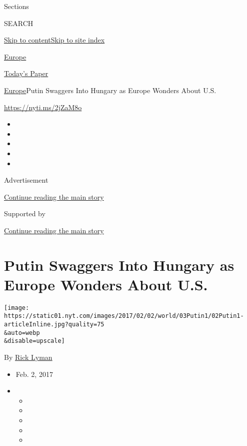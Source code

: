 Sections

SEARCH

\protect\hyperlink{site-content}{Skip to
content}\protect\hyperlink{site-index}{Skip to site index}

\href{https://www.nytimes.com/section/world/europe}{Europe}

\href{https://myaccount.nytimes.com/auth/login?response_type=cookie\&client_id=vi}{}

\href{https://www.nytimes.com/section/todayspaper}{Today's Paper}

\href{/section/world/europe}{Europe}\textbar{}Putin Swaggers Into
Hungary as Europe Wonders About U.S.

\url{https://nyti.ms/2jZaM8o}

\begin{itemize}
\item
\item
\item
\item
\item
\end{itemize}

Advertisement

\protect\hyperlink{after-top}{Continue reading the main story}

Supported by

\protect\hyperlink{after-sponsor}{Continue reading the main story}

\hypertarget{putin-swaggers-into-hungary-as-europe-wonders-about-us}{%
\section{Putin Swaggers Into Hungary as Europe Wonders About
U.S.}\label{putin-swaggers-into-hungary-as-europe-wonders-about-us}}

\texttt{[image: https://static01.nyt.com/images/2017/02/02/world/03Putin1/02Putin1-articleInline.jpg?quality=75\\\&auto=webp\\\&disable=upscale]}

By \href{https://www.nytimes.com/by/rick-lyman}{Rick Lyman}

\begin{itemize}
\item
  Feb. 2, 2017
\item
  \begin{itemize}
  \item
  \item
  \item
  \item
  \item
  \end{itemize}
\end{itemize}

